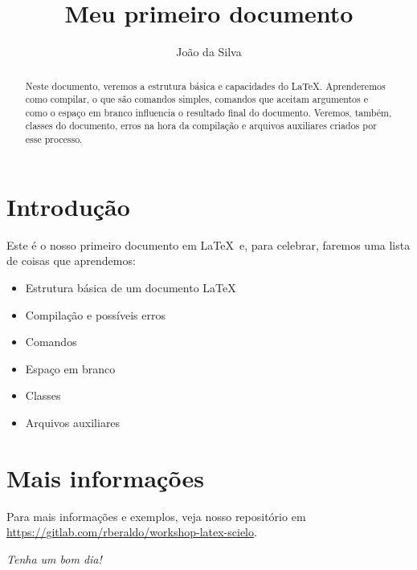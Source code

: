 \documentclass[11pt,a4paper]{article}
\title{Meu primeiro documento}
\author{João da Silva}
\begin{document}
\frenchspacing

\maketitle

\begin{abstract}
  Neste documento, veremos a estrutura básica e capacidades do \LaTeX.
  Aprenderemos como compilar, o que são comandos simples, comandos que aceitam
  argumentos e como o espaço em branco influencia o resultado final do
  documento. Veremos, também, classes do documento, erros na hora da compilação
  e arquivos auxiliares criados por esse processo.
\end{abstract}

\tableofcontents

\section{Introdução}

Este é o nosso primeiro documento em \LaTeX\ e, para celebrar, faremos uma
lista de coisas que aprendemos:

\begin{itemize}
  \item Estrutura básica de um documento \LaTeX
  \item Compilação e possíveis erros
  \item Comandos
  \item Espaço em branco
  \item Classes
  \item Arquivos auxiliares
\end{itemize}

\section{Mais informações}

Para mais informações e exemplos, veja nosso repositório em
\url{https://gitlab.com/rberaldo/workshop-latex-scielo}.

\begin{center}
  \textit{Tenha um bom dia!}
\end{center}
\end{document}
